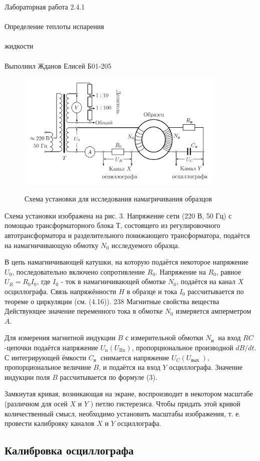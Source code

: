 \documentclass{astroedu-lab}
\begin{document}
\begin{problem}{\huge Лабораторная работа 2.4.1\\\\Определение теплоты испарения\\\\жидкости\\\\Выполнил Жданов Елисей Б01-205}
\begin{figure}[!h]
	\centering
	\caption{Схема установки для исследования намагричивания образцов}
	\includegraphics[width=0.9\textwidth]{установка.png}
	\label{fig:boiler}
\end{figure}

Схема установки изображена на рис. 3. Напряжение сети (220 В, 50 Гц) с помощью трансформаторного блока Т, состоящего из регулировочного автотрансформатора и разделительного понижающего трансформатора, подаётся на намагничивающую обмотку $N_0$ исследуемого образца.

В цепь намагничивающей катушки, на которую подаётся некоторое напряжение $U_0$, последовательно включено сопротивление $R_0$. Напряжение на $R_0$, равное $U_R=R_0 I_0$, где $I_0$ - ток в намагничивающей обмотке $N_0$, подаётся на канал $X$ осциллографа. Связь напряжённости $H$ в образце и тока $I_0$ рассчитывается по теореме о циркуляции (см. (4.16)).
238
Магнитные свойства вещества
Действующее значение переменного тока в обмотке $N_0$ измеряется амперметром $A$.

Для измерения магнитной индукции $B$ с измерительной обмотки $N_{\text {и }}$ на вход $R C$-цепочки подаётся напряжение $U_{\mathrm{n}}\left(U_{\mathrm{Bx}}\right)$, пропорциональное производной $d B / d t$. С интегрирующей ёмкости $C_{\text {и }}$ снимается напряжение $U_C\left(U_{\text {вых }}\right)$, пропорциональное величине $B$, и подаётся на вход $Y$ осциллографа. Значение индукции поля $B$ рассчитывается по формуле (3).

Замкнутая кривая, возникающая на экране, воспроизводит в некотором масштабе (различном для осей $X$ и $Y$ ) петлю гистерезиса. Чтобы придать этой кривой количественный смысл, необходимо установить масштабы изображения, т. е. провести калибровку каналов $X$ и $Y$ осциллографа.

\subsection{Калибровка осциллографа}


\end{problem}
\end{document}
